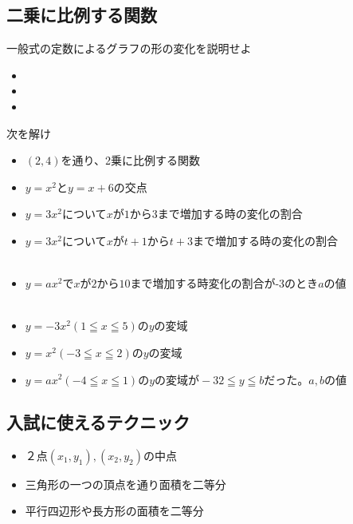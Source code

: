 \documentclass[10pt]{jsarticle}
\begin{document}
\subsection{二乗に比例する関数}
\begin{itembox}[l]{一般式の定数によるグラフの形の変化を説明せよ}
	\begin{itemize}
		\item
		\item
		\item
	\end{itemize}
\end{itembox}

\begin{itembox}[l]{次を解け}
	\begin{itemize}
		\item $(2,4)$を通り、2乗に比例する関数\\
		\item $y=x^2$と$y=x+6$の交点\\
		\item $y=3x^2$について$xが1から3$まで増加する時の変化の割合\\
		\item $y=3x^2$について$xがt+1からt+3$まで増加する時の変化の割合\\\\
		\item $y=ax^2$で$xが2から10まで$増加する時変化の割合が-3のとき$a$の値\\\\
		\item $y=-3x^2 $$(1\leqq x \leqq 5) $の$y$の変域\\
		\item $y=x^2(-3\leqq x \leqq 2)$の$y$の変域\\
		\item $y=ax^2(-4\leqq x\leqq 1)のyの変域が-32≦y≦bだった。a,bの値$\\
	\end{itemize}
\end{itembox}





\subsection{入試に使えるテクニック}
\begin{itembox}[l]{}
	\begin{itemize}
		\item ２点$(x_1,y_1),(x_2,y_2)$の中点\\
		\item 三角形の一つの頂点を通り面積を二等分\\
		\item 平行四辺形や長方形の面積を二等分\\
	\end{itemize}
\end{itembox}
\end{document}
